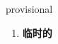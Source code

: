 
\begin{frame}
{\huge provisional}
\begin{center}
\begin{enumerate}\Large
  \item \textbf{临时的}
\end{enumerate}
\end{center}
\end{frame}
